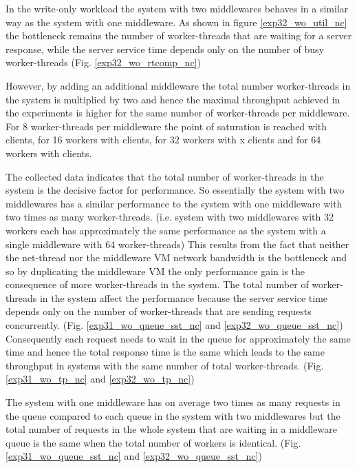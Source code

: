 \documentclass[11pt,a4paper]{article}
\begin{document}
In the write-only workload the system with two middlewares behaves in a similar way as the system with one middleware. 
As shown in figure \ref{exp32_wo_util_nc} the bottleneck remains the number of worker-threads that are waiting for a server response, while the server service time depends only on the number of busy worker-threads (Fig. \ref{exp32_wo_rtcomp_nc})


However, by adding an additional middleware the total number worker-threads in the system is multiplied by two and hence the maximal throughput achieved in the experiments is higher for the same number of worker-threads per middleware.
For 8 worker-threads per middleware the point of saturation is reached with  clients, for 16 workers with  clients, for 32 workers with {x} clients and for 64 workers with  clients.  


The collected data indicates that the total number of worker-threads in the system is the decisive factor for performance.
So essentially the system with two middlewares has a similar performance to the system with one middleware with two times as many worker-threads. (i.e. system with two middlewares with 32 workers each has approximately the same performance as the system with a single middleware with 64 worker-threads)
This results from the fact that neither the net-thread nor the middleware VM network bandwidth is the bottleneck and so by duplicating the middleware VM the only performance gain is the consequence of more worker-threads in the system.
The total number of worker-threads in the system affect the performance because the server service time depends only on the number of worker-threads that are sending requests concurrently. (Fig. \ref{exp31_wo_queue_sst_nc} and \ref{exp32_wo_queue_sst_nc})
Consequently each request needs to wait in the queue for approximately the same time and hence the total response time is the same which leads to the same throughput in systems with the same number of total worker-threads. (Fig. \ref{exp31_wo_tp_nc} and \ref{exp32_wo_tp_nc})

The system with one middleware has on average two times as many requests in the queue compared to each queue in the system with two middlewares but the total number of requests in the whole system that are waiting in a middleware queue is the same when the total number of workers is identical. (Fig. \ref{exp31_wo_queue_sst_nc} and \ref{exp32_wo_queue_sst_nc})
\end{document}
